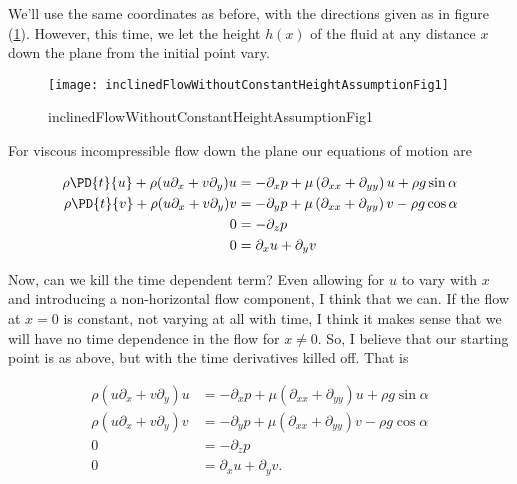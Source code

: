 We'll use the same coordinates as before, with the directions given as in figure (\ref{fig:inclinedFlowWithoutConstantHeightAssumption:inclinedFlowWithoutConstantHeightAssumptionFig1}).  However, this time, we let the height $h(x)$ of the fluid at any distance $x$ down the plane from the initial point vary.

\begin{figure}[htp]
   \centering
   \texttt{[image: inclinedFlowWithoutConstantHeightAssumptionFig1]}
   \caption{inclinedFlowWithoutConstantHeightAssumptionFig1}\label{fig:inclinedFlowWithoutConstantHeightAssumption:inclinedFlowWithoutConstantHeightAssumptionFig1}
\end{figure}

For viscous incompressible flow down the plane our equations of motion are

\begin{align}\label{eqn:inclinedFlowWithoutConstantHeightAssumption:20}
\rho \PD{t}{u} + \rho (u \partial_x + v \partial_y) u &= -\partial_x p + \mu \left(\partial_{xx} + \partial_{yy}\right) u + \rho g \sin\alpha \\
\rho \PD{t}{v} + \rho (u \partial_x + v \partial_y) v &= -\partial_y p + \mu \left(\partial_{xx} + \partial_{yy}\right) v - \rho g \cos\alpha \\
0 &= -\partial_z p \\
0 &= \partial_x u + \partial_y v
\end{align}

Now, can we kill the time dependent term?  Even allowing for $u$ to vary with $x$ and introducing a non-horizontal flow component, I think that we can.  If the flow at $x = 0$ is constant, not varying at all with time, I think it makes sense that we will have no time dependence in the flow for $x \ne 0$.  So, I believe that our starting point is as above, but with the time derivatives killed off.  That is

\begin{align}\label{eqn:inclinedFlowWithoutConstantHeightAssumption:40}
\rho (u \partial_x + v \partial_y) u &= -\partial_x p + \mu \left(\partial_{xx} + \partial_{yy}\right) u + \rho g \sin\alpha \\
\rho (u \partial_x + v \partial_y) v &= -\partial_y p + \mu \left(\partial_{xx} + \partial_{yy}\right) v - \rho g \cos\alpha \\
0 &= -\partial_z p \\
0 &= \partial_x u + \partial_y v.
\end{align}

